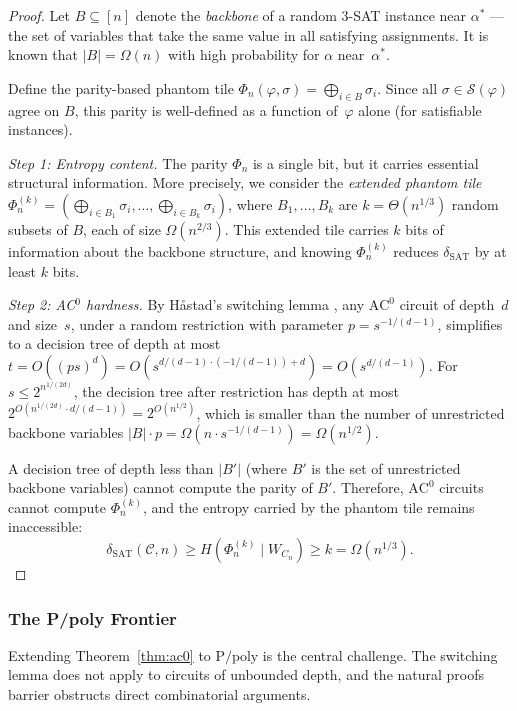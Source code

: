 \documentclass[11pt]{article}
\theoremstyle{definition}
\theoremstyle{remark}
\newcommand{\calC}{\mathcal{C}}
\newcommand{\calS}{\mathcal{S}}
\newcommand{\Ppoly}{\mathrm{P/poly}}
\newcommand{\ACz}{\mathrm{AC}^0}
\newcommand{\dSAT}{\delta_{\mathrm{SAT}}}
\begin{document}
\begin{proof}
Let $B \subseteq [n]$ denote the \emph{backbone} of a random 3-SAT instance
near $\alpha^*$ --- the set of variables that take the same value in all
satisfying assignments.  It is known \cite{ART} that $|B| = \Omega(n)$ with
high probability for $\alpha$ near~$\alpha^*$.

Define the parity-based phantom tile $\Phi_n(\varphi, \sigma) = \bigoplus_{i \in B} \sigma_i$.
Since all $\sigma \in \calS(\varphi)$ agree on $B$, this parity is well-defined
as a function of~$\varphi$ alone (for satisfiable instances).

\emph{Step 1: Entropy content.}  The parity $\Phi_n$ is a single bit, but it
carries essential structural information.  More precisely, we consider the
\emph{extended phantom tile} $\Phi_n^{(k)} = (\bigoplus_{i \in B_1} \sigma_i,
\ldots, \bigoplus_{i \in B_k} \sigma_i)$, where $B_1, \ldots, B_k$ are
$k = \Theta(n^{1/3})$ random subsets of $B$, each of size $\Omega(n^{2/3})$.
This extended tile carries $k$ bits of information about the backbone
structure, and knowing $\Phi_n^{(k)}$ reduces $\dSAT$ by at least $k$ bits.

\emph{Step 2: AC$^0$ hardness.}  By H\aa stad's switching lemma \cite{Hastad},
any $\ACz$ circuit of depth~$d$ and size~$s$, under a random restriction with
parameter $p = s^{-1/(d-1)}$, simplifies to a decision tree of depth at most
$t = O((ps)^d) = O(s^{d/(d-1) \cdot (-1/(d-1)) + d}) = O(s^{d/(d-1)})$.
For $s \leq 2^{n^{1/(2d)}}$, the decision tree after restriction has depth
at most $2^{O(n^{1/(2d)} \cdot d/(d-1))} = 2^{O(n^{1/2})}$, which is
smaller than the number of unrestricted backbone variables $|B| \cdot p
= \Omega(n \cdot s^{-1/(d-1)}) = \Omega(n^{1/2})$.

A decision tree of depth less than $|B'|$ (where $B'$ is the set of
unrestricted backbone variables) cannot compute the parity of $B'$.
Therefore, $\ACz$ circuits cannot compute $\Phi_n^{(k)}$, and the entropy
carried by the phantom tile remains inaccessible:
\[
  \dSAT(\calC, n) \geq H(\Phi_n^{(k)} \mid W_{C_n}) \geq k = \Omega(n^{1/3}).
\]
\end{proof}

\subsubsection{The P/poly Frontier}

Extending Theorem~\ref{thm:ac0} to $\Ppoly$ is the central challenge.
The switching lemma does not apply to circuits of unbounded depth, and
the natural proofs barrier \cite{RR} obstructs direct combinatorial arguments.
\end{document}

